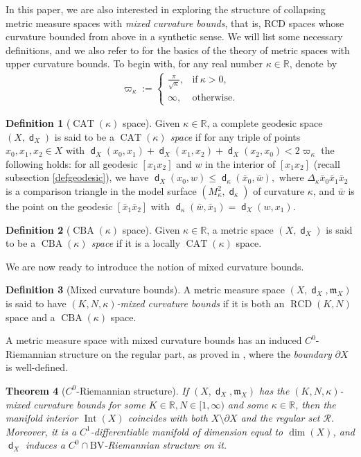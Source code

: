 \documentclass[11pt,reqno]{amsart}
\newtheorem{theorem}{Theorem}[section]
\theoremstyle{definition}
\newtheorem{definition}[theorem]{Definition}
\numberwithin{equation}{section}
\newcommand{\dR}{\mathbb{R}}
\newcommand{\fm}{\mathfrak{m}}
\DeclareMathOperator{\CAT}{CAT}
\DeclareMathOperator{\CBA}{CBA}
\DeclareMathOperator{\dist}{\mathsf{d}}
\DeclareMathOperator{\Int}{Int}
\DeclareMathOperator{\RCD}{RCD}
\begin{document}
In this paper, 
we are also interested in exploring the structure of collapsing metric measure spaces with {\it mixed curvature bounds}, that is,   RCD spaces whose curvature bounded from above in a synthetic sense.
We will list some necessary definitions, and we also refer to \cite{AKP-Alexandrov, BH, BBI} for the basics of the theory of metric spaces with upper curvature bounds.
To begin with, for any real number $\kappa \in \dR$, denote by 
\begin{align}\label{d:varpi}
 \varpi_{\kappa}  := 
 \begin{cases}
     \frac{\pi}{\sqrt{\kappa}}, & \text{if} \ \kappa > 0, 
     \\
 \infty, &  \text{otherwise}.   
 \end{cases}
\end{align}

\begin{definition}
[$\CAT(\kappa)$ space] Given $\kappa \in \dR$, a complete geodesic space $(X,\dist_X)$ is said to be a \textit{$\CAT(\kappa)$ space} if for any triple of points $x_0,x_1,x_2\in X$ with $\dist_X(x_0,x_1) + \dist_X(x_1,x_2) + \dist_X(x_2, x_0) < 2 \varpi_{\kappa}$ the following holds: for all geodesic $[x_1x_2]$ and $w$ in the interior of $[x_1x_2]$ (recall subsection \ref{defgeodesic}), we have $
\dist_X(x_0, w) \leq \dist_{\kappa}(\bar{x}_0, \bar{w}),
$
where $\Delta_{\kappa} \bar{x}_0 \bar{x}_1 \bar{x}_2$ is a comparison triangle in the model surface $(M_{\kappa}^2, \dist_{\kappa})$ of curvature $\kappa$, and $\bar{w}$ is the point on the geodesic $[\bar{x}_1\bar{x}_2]$ with $\dist_{\kappa} (\bar{w}, \bar{x}_1) = \dist_X(w, x_1)$.
\end{definition}

\begin{definition}[$\CBA(\kappa)$ space]\label{defcba}
Given $\kappa\in\dR$, a metric space $(X,\dist_X)$ is said to be a \textit{$\CBA(\kappa)$ space} if it is a locally $\CAT(\kappa)$ space.
\end{definition}

We are now ready to introduce the notion of mixed curvature bounds.
\begin{definition}[Mixed curvature bounds]\label{defmixed}
 A metric measure space $(X, \dist_X, \fm_X)$
is said to have \textit{$(K, N, \kappa)$-mixed curvature bounds} if it is both an $\RCD(K,N)$ space and 
a $\CBA(\kappa)$ space.
\end{definition}


A metric measure space with mixed curvature bounds 
has an induced $C^0$-Riemannian structure on the regular part, as proved in \cite[Theorem 1.1]{KKK}, where the \textit{boundary} $\partial X$ is well-defined.
\begin{theorem}[$C^0$-Riemannian structure] If $(X,\dist_X,\fm_X)$ 
has the $(K, N, \kappa)$-mixed curvature bounds for some $K\in \dR, N\in [1, \infty)$   
and some
$\kappa \in \mathbb{R}$, then the manifold interior
$\Int(X)$ coincides with both $X \setminus \partial X$ and the regular set $\mathcal{R}$. Moreover, it is a $C^1$-differentiable manifold of dimension equal to $\dim(X)$, and $\dist_X$ induces a $C^0\cap \mathrm{BV}$-Riemannian structure on it.
\end{theorem}
\end{document}
